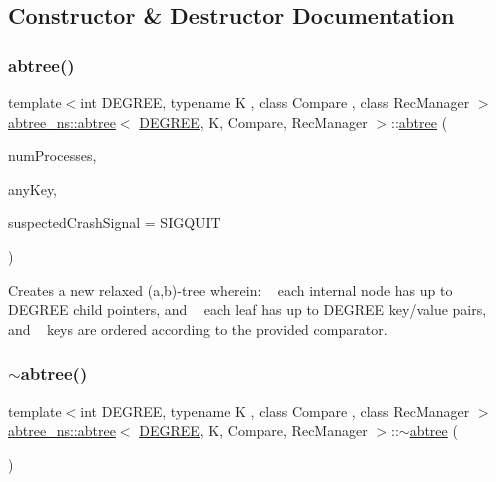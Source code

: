 \subsection{Constructor \& Destructor Documentation}
\mbox{\label{classabtree__ns_1_1abtree_a1b7319a8a3f68d6106c2e011713201a7}} 
\subsubsection{\texorpdfstring{abtree()}{abtree()}\hspace{0.1cm}{\footnotesize\ttfamily [1/2]}}
{\footnotesize\ttfamily template$<$int D\+E\+G\+R\+EE, typename K , class Compare , class Rec\+Manager $>$ \\
\hyperlink{classabtree__ns_1_1abtree}{abtree\+\_\+ns\+::abtree}$<$ \hyperlink{brown__sigouin__abtree__kcas_2adapter_8h_a5d88b17d70c985f2f2b8e987037fd6dd}{D\+E\+G\+R\+EE}, K, Compare, Rec\+Manager $>$\+::\hyperlink{classabtree__ns_1_1abtree}{abtree} (\begin{DoxyParamCaption}\item[{const int}]{num\+Processes,  }\item[{const K}]{any\+Key,  }\item[{int}]{suspected\+Crash\+Signal = {\ttfamily SIGQUIT} }\end{DoxyParamCaption})\hspace{0.3cm}{\ttfamily [inline]}}

Creates a new relaxed (a,b)-\/tree wherein\+: ~\newline
 each internal node has up to {\ttfamily D\+E\+G\+R\+EE} child pointers, and ~\newline
 each leaf has up to {\ttfamily D\+E\+G\+R\+EE} key/value pairs, and ~\newline
 keys are ordered according to the provided comparator. \mbox{\label{classabtree__ns_1_1abtree_a083203a9c7d98c33b08b034a83f40e0e}} 
\subsubsection{\texorpdfstring{$\sim$abtree()}{~abtree()}\hspace{0.1cm}{\footnotesize\ttfamily [1/2]}}
{\footnotesize\ttfamily template$<$int D\+E\+G\+R\+EE, typename K , class Compare , class Rec\+Manager $>$ \\
\hyperlink{classabtree__ns_1_1abtree}{abtree\+\_\+ns\+::abtree}$<$ \hyperlink{brown__sigouin__abtree__kcas_2adapter_8h_a5d88b17d70c985f2f2b8e987037fd6dd}{D\+E\+G\+R\+EE}, K, Compare, Rec\+Manager $>$\+::$\sim$\hyperlink{classabtree__ns_1_1abtree}{abtree} (\begin{DoxyParamCaption}{ }\end{DoxyParamCaption})\hspace{0.3cm}{\ttfamily [inline]}}

